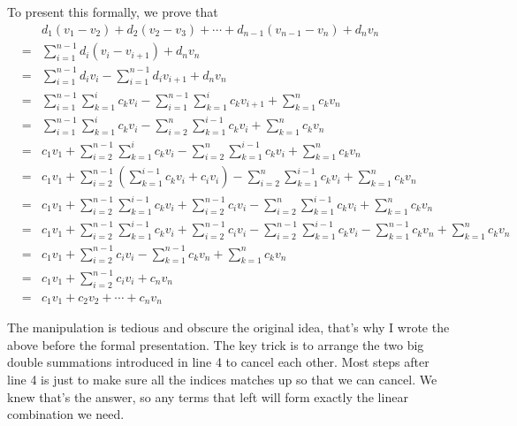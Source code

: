 To present this formally, we prove that 
\begin{eqnarray*}
  & & d_1 (v_1 - v_2) + d_2 (v_2 - v_3) + \cdots + d_{n-1}(v_{n-1} - v_n) + d_n v_n \\
  &=& \sum\limits_{i=1}^{n-1} d_i (v_i - v_{i+1}) + d_n v_n \\
  &=& \sum\limits_{i=1}^{n-1} d_i v_i - \sum\limits_{i=1}^{n-1} d_i v_{i+1} + d_n v_n \\
  &=& \sum\limits_{i=1}^{n-1} \sum\limits_{k=1}^{i}{c_k} v_i - \sum\limits_{i=1}^{n-1} \sum\limits_{k=1}^{i}{c_k} v_{i+1} + \sum\limits_{k=1}^{n}{c_k} v_n \\
  &=& \sum\limits_{i=1}^{n-1} \sum\limits_{k=1}^{i}{c_k} v_i - \sum\limits_{i=2}^{n} \sum\limits_{k=1}^{i-1}{c_k} v_{i} + \sum\limits_{k=1}^{n}{c_k} v_n \\
  &=& c_1 v_1 + \sum\limits_{i=2}^{n-1} \sum\limits_{k=1}^{i}{c_k} v_i - \sum\limits_{i=2}^{n} \sum\limits_{k=1}^{i-1}{c_k} v_{i} + \sum\limits_{k=1}^{n}{c_k} v_n \\
  &=& c_1 v_1 + \sum\limits_{i=2}^{n-1} \left(\sum\limits_{k=1}^{i-1}{c_k} v_i + c_iv_i\right) - \sum\limits_{i=2}^{n} \sum\limits_{k=1}^{i-1}{c_k} v_{i} + \sum\limits_{k=1}^{n}{c_k} v_n \\
  &=& c_1 v_1 + \sum\limits_{i=2}^{n-1} \sum\limits_{k=1}^{i-1}{c_k} v_i + \sum\limits_{i=2}^{n-1} c_iv_i - \sum\limits_{i=2}^{n} \sum\limits_{k=1}^{i-1}{c_k} v_{i} + \sum\limits_{k=1}^{n}{c_k} v_n \\
  &=& c_1 v_1 + \sum\limits_{i=2}^{n-1} \sum\limits_{k=1}^{i-1}{c_k} v_i + \sum\limits_{i=2}^{n-1} c_iv_i - \sum\limits_{i=2}^{n-1} \sum\limits_{k=1}^{i-1}{c_k} v_{i} - \sum\limits_{k=1}^{n-1}{c_k} v_n + \sum\limits_{k=1}^{n}{c_k} v_n \\
  &=& c_1 v_1 + \sum\limits_{i=2}^{n-1} c_iv_i - \sum\limits_{k=1}^{n-1}{c_k} v_n + \sum\limits_{k=1}^{n}{c_k} v_n \\
  &=& c_1 v_1 + \sum\limits_{i=2}^{n-1} c_iv_i + c_n v_n \\
  &=& c_1 v_1 + c_2 v_2 + \cdots + c_n v_n
\end{eqnarray*}

The manipulation is tedious and obscure the original idea, that's why I wrote the above before the formal presentation. The key trick is to arrange the two big double summations introduced in line 4 to cancel each other. Most steps after line 4 is just to make sure all the indices matches up so that we can cancel. We knew that's the answer, so any terms that left will form exactly the linear combination we need.